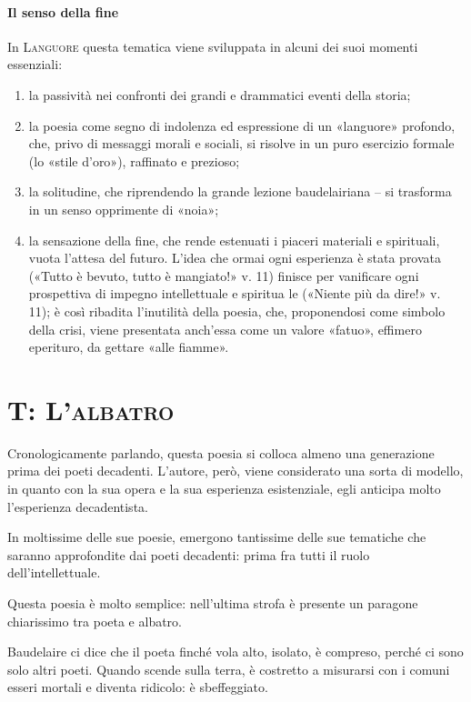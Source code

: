 \documentclass{book}
\begin{document}
\paragraph{Il senso della fine} In \textsc{Languore} questa tematica viene sviluppata in alcuni dei suoi momenti essenziali: 
\begin{enumerate}
\item la passività nei confronti dei grandi e drammatici eventi della storia;
\item la poesia come segno di indolenza ed espressione di un «languore» profondo, che, privo di messaggi morali e sociali, si risolve in un puro esercizio formale (lo «stile d'oro»), raffinato e prezioso; 
\item la solitudine, che riprendendo la grande lezione baudelairiana – si trasforma in un senso opprimente di «noia»;
\item la sensazione della fine, che rende estenuati i piaceri materiali e spirituali, vuota l'attesa del futuro. L'idea che ormai ogni esperienza è stata provata («Tutto è bevuto, tutto è mangiato!» v. 11) finisce per vanificare ogni prospettiva di impegno intellettuale e spiritua le («Niente più da dire!» v. 11); è così ribadita l'inutilità della poesia, che, proponendosi come simbolo della crisi, viene presentata anch'essa come un valore «fatuo», effimero eperituro, da gettare «alle fiamme».
\end{enumerate}

\section{T: \textsc{L'albatro}}

Cronologicamente parlando, questa poesia si colloca almeno una
generazione prima dei poeti decadenti. L'autore, però, viene considerato
una sorta di modello, in quanto con la sua opera e la sua esperienza
esistenziale, egli anticipa molto l'esperienza decadentista.

In moltissime delle sue poesie, emergono tantissime delle sue tematiche
che saranno approfondite dai poeti decadenti: prima fra tutti il ruolo
dell'intellettuale.

Questa poesia è molto semplice: nell'ultima strofa è presente un
paragone chiarissimo tra poeta e albatro.

Baudelaire ci dice che il poeta finché vola alto, isolato, è compreso,
perché ci sono solo altri poeti. Quando scende sulla terra, è costretto
a misurarsi con i comuni esseri mortali e diventa ridicolo: è
sbeffeggiato.
\end{document}
